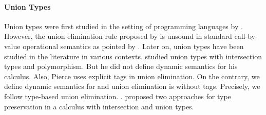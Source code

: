 \paragraph{Union Types}
\begin{comment}
Set-theoretic unions have sound theory and extensively studied in
mathematics. Set-theoretic unions correspond to union types or
disjoint union types in programming languages. Disjoint union types
are also called sum types or variants.  Constructors are explicitly
labeled in disjoint union types and expressions are manipulated using
corresponding labels. Few other interesting calculi (and this paper)
do not use labels and provide type-based union elimination.
\end{comment}
Union types were first studied in the setting of programming languages
by \citet{macqueen1984ideal}. However, the union elimination rule
proposed by \citet{macqueen1984ideal} is unsound in standard call-by-value
operational semantics as pointed by \cite{dunfield2003type}.
Later on, union types have been studied
in the literature in various contexts. \citet{pierce1991programming}
studied union types with intersection types and polymorphism. But he
did not define dynamic semantics for his calculus. Also, Pierce
uses explicit tags in union elimination. On the contrary, we define
dynamic semantics for \cal and union elimination is without tags.
Precisely, we follow type-based union elimination.
.
\citet{barbanera1995intersection} proposed
two approaches for type preservation in a calculus with intersection and union
types.

